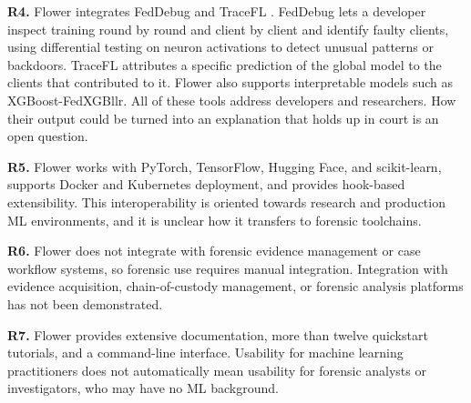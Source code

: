 \textbf{R4.} Flower integrates FedDebug \citep{FedDebug} and TraceFL \citep{TraceFL}. FedDebug lets a developer inspect training round by round and client by client and identify faulty clients, using differential testing on neuron activations to detect unusual patterns or backdoors. TraceFL attributes a specific prediction of the global model to the clients that contributed to it. Flower also supports interpretable models such as XGBoost-FedXGBllr. All of these tools address developers and researchers. How their output could be turned into an explanation that holds up in court is an open question.

\textbf{R5.} Flower works with PyTorch, TensorFlow, Hugging Face, and scikit-learn, supports Docker and Kubernetes deployment, and provides hook-based extensibility. This interoperability is oriented towards research and production ML environments, and it is unclear how it transfers to forensic toolchains.

\textbf{R6.} Flower does not integrate with forensic evidence management or case workflow systems, so forensic use requires manual integration. Integration with evidence acquisition, chain-of-custody management, or forensic analysis platforms has not been demonstrated.

\textbf{R7.} Flower provides extensive documentation, more than twelve quickstart tutorials, and a command-line interface. Usability for machine learning practitioners does not automatically mean usability for forensic analysts or investigators, who may have no ML background.
